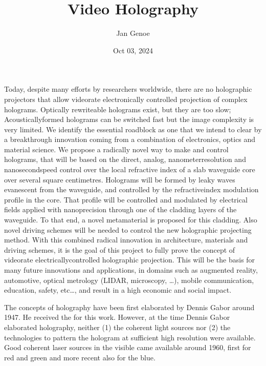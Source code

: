 \documentclass[a4paper,10pt,english,openany,oneside]{jupyterBook}
\title{Video Holography}
\date{Oct 03, 2024}
\author{Jan Genoe}
\begin{document}
\pagestyle{empty}
\sphinxmaketitle
\pagestyle{plain}
\sphinxtableofcontents
\pagestyle{normal}
\label{\detokenize{intro2::doc}}


\begin{DUlineblock}{0em}
\item[] 
\end{DUlineblock}

\sphinxAtStartPar
Today, despite many efforts by researchers world\sphinxhyphen{}wide, there are no holographic projectors that allow video\sphinxhyphen{}rate electronically controlled projection of complex holograms. Optically re\sphinxhyphen{}write\sphinxhyphen{}able holograms exist, but they are too slow; Acoustically\sphinxhyphen{}formed holograms can be switched fast but the image complexity is very limited. We identify the essential roadblock as one that we intend to clear by a breakthrough innovation coming from a combination of electronics, optics and material science.
We propose a radically novel way to make and control holograms, that will be based on the direct, analog, nanometer\sphinxhyphen{}resolution and nanosecond\sphinxhyphen{}speed control over the local refractive index of a slab waveguide core over several square centimetres. Holograms will be formed by leaky waves evanescent from the waveguide, and controlled by the refractive\sphinxhyphen{}index modulation profile in the core. That profile will be controlled and modulated by electrical fields applied with nano\sphinxhyphen{}precision through one of the cladding layers of the waveguide. To that end, a novel metamaterial is proposed for this cladding. Also novel driving schemes will be needed to control the new holographic projecting method.
With this combined radical innovation in architecture, materials and driving schemes, it is the goal of this project to fully prove the concept of video\sphinxhyphen{}rate electrically\sphinxhyphen{}controlled holographic projection. This will be the basis for many future innovations and applications, in domains such as augmented reality, automotive, optical metrology (LIDAR, microscopy, …), mobile communication, education, safety, etc…, and result in a high economic and social impact.

\begin{DUlineblock}{0em}
\item[] 
\end{DUlineblock}

\sphinxAtStartPar
The concepts of holography have been first elaborated by Dennis Gabor around 1947. He received the  for this work. However, at the time Dennis Gabor elaborated holography, neither (1) the coherent light sources nor (2) the technologies to pattern the hologram at sufficient high resolution were available. Good coherent laser sources in the visible came available around 1960, first for red and green and more recent also for the blue.
\end{document}

